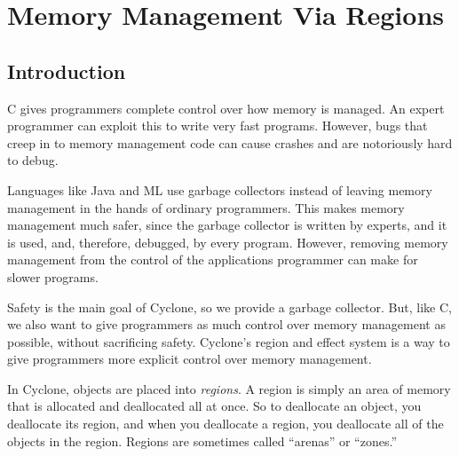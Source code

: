 \section{Memory Management Via Regions}
\label{sec:regions}


\subsection{Introduction}

C gives programmers complete control over how memory is managed.  An
expert programmer can exploit this to write very fast programs.
However, bugs that creep in to memory management code can cause
crashes and are notoriously hard to debug.

Languages like Java and ML use garbage collectors instead of leaving
memory management in the hands of ordinary programmers.  This makes
memory management much safer, since the garbage collector is written
by experts, and it is used, and, therefore, debugged, by every
program.  However, removing memory management from the control of the
applications programmer can make for slower programs.

Safety is the main goal of Cyclone, so we provide a garbage collector.
But, like C, we also want to give programmers as much control over
memory management as possible, without sacrificing safety.  Cyclone's
region and effect system is a way to give programmers more explicit
control over memory management.

In Cyclone, objects are placed into \emph{regions}.  A region is
simply an area of memory that is allocated and deallocated all at
once.  So to deallocate an object, you deallocate its region, and
when you deallocate a region, you deallocate all of the objects in the
region.  Regions are sometimes called ``arenas'' or ``zones.''

